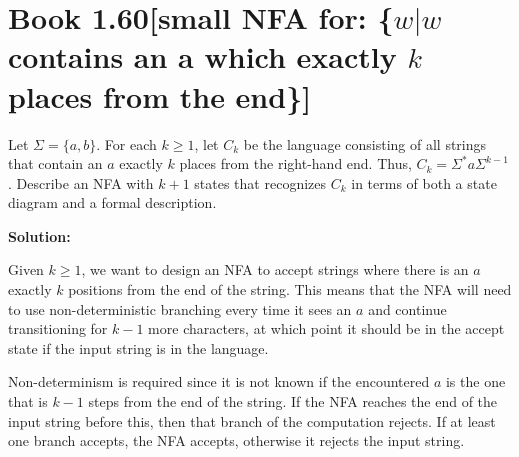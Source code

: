\documentclass[11pt]{article}
\newenvironment{question}[2]
{\newpage\section{#1\texorpdfstring{\hfill}{horizontal spacing}{\rm\normalsize #2}}}{}
\newenvironment{solution}
{\textbf{Solution: }\color{blue}}
{\color{black}}
\begin{document}

\begin{question}{Book 1.60}{[small NFA for: \{\(w | w\) contains an \textbf{a} which exactly \(k\) places from the end\}]}

Let \(\Sigma = \{a,b\}\). For each \(k \geq 1\), let \(C_k\) be the language consisting of all strings that contain an \(a\) exactly \(k\) places from the right-hand end. Thus, \(C_k = \Sigma^* a \Sigma^{k-1}\). Describe an NFA with \(k+1\) states that recognizes \(C_k\) in terms of both a state diagram and a formal description.

\begin{solution}

Given \(k \geq 1\), we want to design an NFA to accept strings where there is an \(a\) exactly \(k\) positions from the end of the string. This means that the NFA will need to use non-deterministic branching every time it sees an \(a\) and continue transitioning for \(k-1\) more characters, at which point it should be in the accept state if the input string is in the language. 

Non-determinism is required since it is not known if the encountered \(a\) is the one that is \(k-1\) steps from the end of the string. If the NFA reaches the end of the input string before this, then that branch of the computation rejects. If at least one branch accepts, the NFA accepts, otherwise it rejects the input string.


\end{solution}
\end{question}
\end{document}
